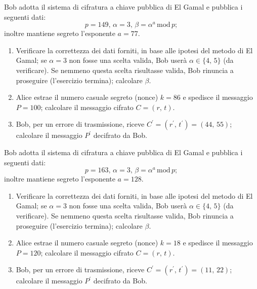         Bob adotta il sistema di cifratura a chiave pubblica di El Gamal e pubblica i seguenti dati: \[
            p=149,\, \alpha=3,\, \beta= \alpha^{a} \,\mathrm{mod}\, p
        ;\] inoltre mantiene segreto l'esponente $a=77$.
        \begin{enumerate}
            \item Verificare la correttezza dei dati forniti, in base alle ipotesi del metodo di 
                El Gamal; se $\alpha=3$ non fosse una scelta valida, Bob userà $\alpha\in\{4,\,5\}$ 
                (da verificare). Se nemmeno questa scelta risultasse valida, Bob rinuncia a proseguire 
                (l'esercizio termina); calcolare $\beta$.
            \item Alice estrae il numero casuale segreto (nonce) $k=86$ e spedisce il messaggio $P=100$; 
                calcolare il messaggio cifrato $C=(r,\,t)$.
            \item Bob, per un errore di trasmissione, riceve $C^{\prime}=(r^{\prime},\,t^{\prime})=(44,\,55)$; 
                calcolare il messaggio $P^{\prime}$ decifrato da Bob.
        \end{enumerate}

        Bob adotta il sistema di cifratura a chiave pubblica di El Gamal e pubblica i seguenti dati: \[
            p=163,\, \alpha=3,\, \beta= \alpha^{a} \,\mathrm{mod}\, p
        ;\] inoltre mantiene segreto l'esponente $a=128$.
        \begin{enumerate}
            \item Verificare la correttezza dei dati forniti, in base alle ipotesi del metodo di 
                El Gamal; se $\alpha=3$ non fosse una scelta valida, Bob userà $\alpha\in\{4,\,5\}$ 
                (da verificare). Se nemmeno questa scelta risultasse valida, Bob rinuncia a proseguire 
                (l'esercizio termina); calcolare $\beta$.
            \item Alice estrae il numero casuale segreto (nonce) $k=18$ e spedisce il messaggio $P=120$; 
                calcolare il messaggio cifrato $C=(r,\,t)$.
            \item Bob, per un errore di trasmissione, riceve $C^{\prime}=(r^{\prime},\,t^{\prime})=(11,\,22)$; 
                calcolare il messaggio $P^{\prime}$ decifrato da Bob.
        \end{enumerate}

